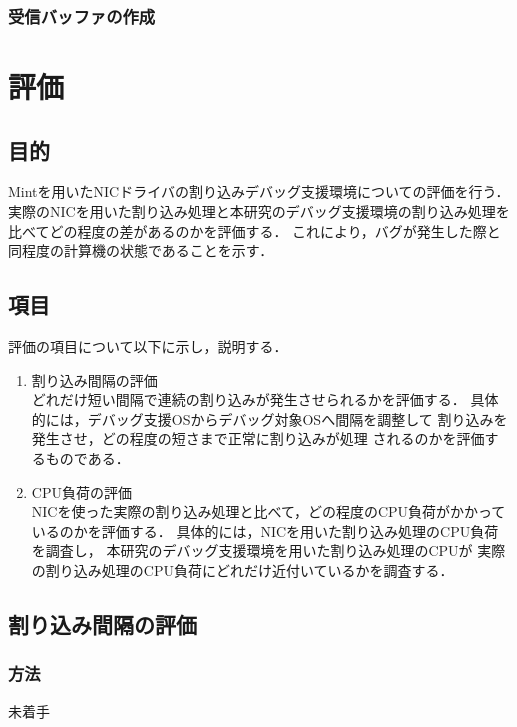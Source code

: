 \documentclass[tanilab-enum]{graduate}
\begin{document}
\subsection{受信バッファの作成}

\chapter{評価}\label{estimaion}
\section{目的}
Mintを用いたNICドライバの割り込みデバッグ支援環境についての評価を行う．
実際のNICを用いた割り込み処理と本研究のデバッグ支援環境の割り込み処理を
比べてどの程度の差があるのかを評価する．
これにより，バグが発生した際と同程度の計算機の状態であることを示す．
\section{項目}
評価の項目について以下に示し，説明する．
\begin{enumerate}
    \item 割り込み間隔の評価\\
        どれだけ短い間隔で連続の割り込みが発生させられるかを評価する．
        具体的には，デバッグ支援OSからデバッグ対象OSへ間隔を調整して
        割り込みを発生させ，どの程度の短さまで正常に割り込みが処理
        されるのかを評価するものである．
    \item CPU負荷の評価\\
        NICを使った実際の割り込み処理と比べて，どの程度のCPU負荷がかかって
        いるのかを評価する．
        具体的には，NICを用いた割り込み処理のCPU負荷を調査し，
        本研究のデバッグ支援環境を用いた割り込み処理のCPUが
        実際の割り込み処理のCPU負荷にどれだけ近付いているかを調査する．
\end{enumerate}
\section{割り込み間隔の評価}
    \subsection{方法}
    未着手
\end{document}
